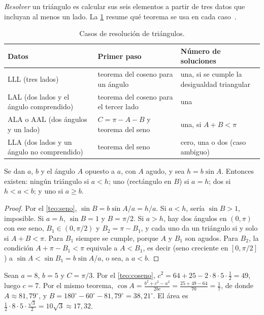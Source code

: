 \emph{Resolver} un triángulo es calcular sus seis elementos a partir de tres datos que incluyan al menos un lado. La \cref{tab:casos} resume qué teorema se usa en cada caso~\cite[§10.1--10.2]{osat}.

\begin{table}[ht]
\centering\small
\caption{Casos de resolución de triángulos.}\label{tab:casos}
\begin{tabular}{@{}>{\raggedright\arraybackslash}p{4.6cm}>{\raggedright\arraybackslash}p{4.6cm}>{\raggedright\arraybackslash}p{4.6cm}@{}}
\toprule
Datos & Primer paso & Número de soluciones \\
\midrule
LLL (tres lados) & teorema del coseno para un ángulo & una, si se cumple la desigualdad triangular \\
LAL (dos lados y el ángulo comprendido) & teorema del coseno para el tercer lado & una \\
ALA o AAL (dos ángulos y un lado) & $C=\pi-A-B$ y teorema del seno & una, si $A+B<\pi$ \\
LLA (dos lados y un ángulo no comprendido) & teorema del seno & cero, una o dos (caso ambiguo) \\
\bottomrule
\end{tabular}
\end{table}

\begin{proposicion}\label{prop:ambiguo}
Se dan $a$, $b$ y el ángulo $A$ opuesto a $a$, con $A$ agudo, y sea $h=b\sin A$. Entonces existen: ningún triángulo si $a<h$; uno (rectángulo en $B$) si $a=h$; dos si $h<a<b$; y uno si $a\ge b$.
\end{proposicion}

\begin{proof}
Por el \cref{teo:seno}, $\sin B=b\sin A/a=h/a$. Si $a<h$, sería $\sin B>1$, imposible. Si $a=h$, $\sin B=1$ y $B=\pi/2$. Si $a>h$, hay dos ángulos en $(0,\pi)$ con ese seno, $B_1\in(0,\pi/2)$ y $B_2=\pi-B_1$, y cada uno da un triángulo si y solo si $A+B<\pi$. Para $B_1$ siempre se cumple, porque $A$ y $B_1$ son agudos. Para $B_2$, la condición $A+\pi-B_1<\pi$ equivale a $A<B_1$, es decir (seno creciente en $[0,\pi/2]$) a $\sin A<\sin B_1=b\sin A/a$, o sea, a $a<b$.
\end{proof}

\begin{ejemplo}\label{ej:lal}
Sean $a=8$, $b=5$ y $C=\pi/3$. Por el \cref{teo:coseno}, $c^{2}=64+25-2\cdot 8\cdot 5\cdot\tfrac12=49$, luego $c=7$. Por el mismo teorema, $\cos A=\frac{b^{2}+c^{2}-a^{2}}{2bc}=\frac{25+49-64}{70}=\frac17$, de donde $A\approx 81{,}79^{\circ}$, y $B=180^{\circ}-60^{\circ}-81{,}79^{\circ}=38{,}21^{\circ}$. El área es $\tfrac12\cdot 8\cdot 5\cdot\frac{\sqrt3}{2}=10\sqrt3\approx 17{,}32$.
\end{ejemplo}

